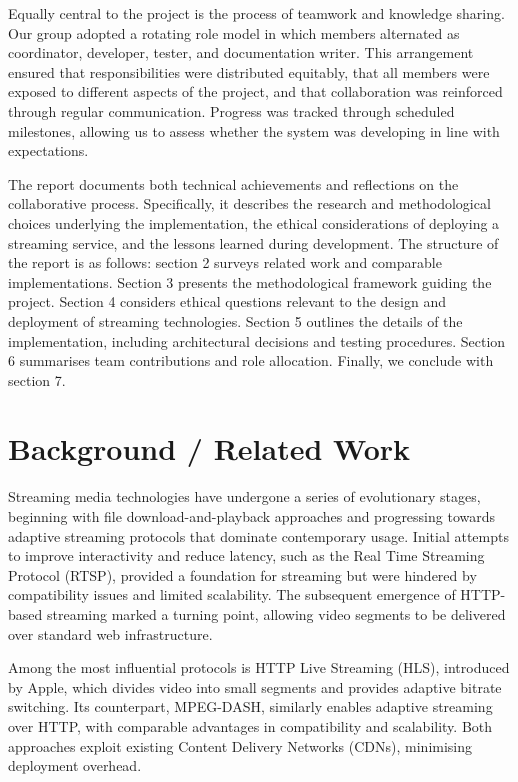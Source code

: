 \documentclass[11pt]{article}
\begin{document}
Equally central to the project is the process of teamwork and knowledge sharing. Our group adopted a rotating role model in which members alternated as coordinator, developer, tester, and documentation writer. This arrangement ensured that responsibilities were distributed equitably, that all members were exposed to different aspects of the project, and that collaboration was reinforced through regular communication. Progress was tracked through scheduled milestones, allowing us to assess whether the system was developing in line with expectations.

The report documents both technical achievements and reflections on the collaborative process. Specifically, it describes the research and methodological choices underlying the implementation, the ethical considerations of deploying a streaming service, and the lessons learned during development. The structure of the report is as follows: section 2 surveys related work and comparable implementations. Section 3 presents the methodological framework guiding the project. Section 4 considers ethical questions relevant to the design and deployment of streaming technologies. Section 5 outlines the details of the implementation, including architectural decisions and testing procedures. Section 6 summarises team contributions and role allocation. Finally, we conclude with section 7.
\newpage
\section{Background / Related Work}
Streaming media technologies have undergone a series of evolutionary stages, beginning with file download-and-playback approaches and progressing towards adaptive streaming protocols that dominate contemporary usage. Initial attempts to improve interactivity and reduce latency, such as the Real Time Streaming Protocol (RTSP), provided a foundation for streaming but were hindered by compatibility issues and limited scalability. The subsequent emergence of HTTP-based streaming marked a turning point, allowing video segments to be delivered over standard web infrastructure.

Among the most influential protocols is HTTP Live Streaming (HLS)\cite{apple_hls}, introduced by Apple, which divides video into small segments and provides adaptive bitrate switching. Its counterpart, MPEG-DASH, similarly enables adaptive streaming over HTTP, with comparable advantages in compatibility and scalability. Both approaches exploit existing Content Delivery Networks (CDNs), minimising deployment overhead.
\end{document}
